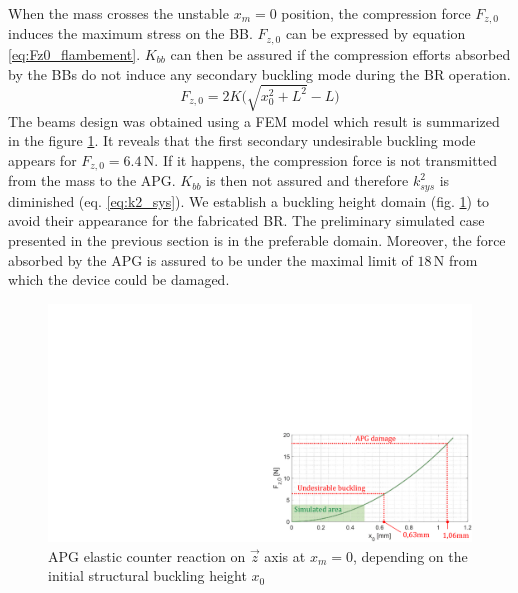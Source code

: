 \documentclass[3p,twocolumn,preprint]{elsarticle}
\begin{document}
When the mass crosses the unstable \mbox{$x_m=0$} position, the compression force $F_{z,0}$ induces the maximum stress on the BB. $F_{z,0}$ can be expressed by equation \ref{eq:Fz0_flambement}. $K_{bb}$ can then be assured if the compression efforts absorbed by the BBs do not induce any secondary buckling mode during the BR operation. 
\begin{equation}
	F_{z,0} = 2K \biggl( \sqrt{x_0^2+L^2}-L \biggr)
	\label{eq:Fz0_flambement}
\end{equation}
The beams design was obtained using a FEM model which result is summarized in the figure \ref{fig:buckling_limit}. It reveals that the first secondary undesirable buckling mode appears for $F_{z,0}=6.4$\,N. If it happens, the compression force is not transmitted from the mass to the APG. $K_{bb}$ is then not assured and therefore $k^2_{sys}$ is diminished (eq. \ref{eq:k2_sys}). We establish a buckling height domain (fig. \ref{fig:buckling_limit}) to avoid their appearance for the fabricated BR. The preliminary simulated case presented in the previous section is in the preferable domain. Moreover, the force absorbed by the APG is assured to be under the maximal limit of $18$\,N from which the device could be damaged.
\begin{figure}[!htbp]
	\centering
	\captionsetup{justification=centering}
	\includegraphics[trim={17.9cm 0cm 0cm 10cm},clip,width=0.9\linewidth]{figures/buckling_limit.pdf}
	\caption{APG elastic counter reaction on $\vec{z}$ axis at $x_m=0$, depending on the initial structural buckling height $x_0$}
	\label{fig:buckling_limit}
\end{figure}

\end{document}
